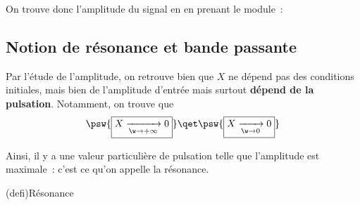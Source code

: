 \documentclass[../../main/main.tex]{subfiles}
\begin{document}
On trouve donc l'amplitude du signal en en prenant le module~:

\psw{
	\[
		\boxed{
			X
			= \abs{\xul{X}}
			= \frac{A_0}{\sqrt{1 + Q^2\left( \frac{\w}{\w_r} - \frac{\w_r}{\w}
					\right)^2}}
		}
	\]
}
\vspace{-15pt}

\subsection{Notion de résonance et bande passante}
Par l'étude de l'amplitude, on retrouve bien que $X$ ne dépend pas des
conditions initiales, mais bien de l'amplitude d'entrée mais surtout
\textbf{dépend de la pulsation}. Notamment, on trouve que
\begin{gather*}
	\psw{
		\boxed{X \xrightarrow[\w\to+\infty]{} 0}
	}
	\qet
	\psw{
		\boxed{X \xrightarrow[\w\to0]{} 0}
	}
\end{gather*}

Ainsi, il y a une valeur particulière de pulsation telle que l'amplitude est
maximale~: c'est ce qu'on appelle la résonance.

\begin{tcb}(defi){Résonance}
\end{tcb}
\end{document}
